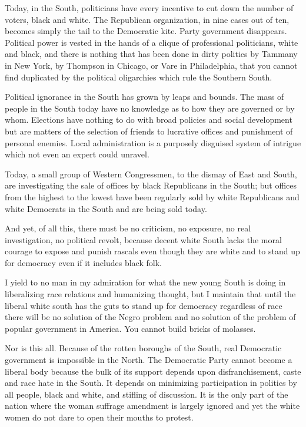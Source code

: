 \documentclass[letterpaper,10pt,english]{jupyterBook}
\begin{document}
\sphinxAtStartPar
Today, in the South, politicians have every incentive to cut down the number of voters, black and white. The Republican organization, in nine cases out of ten, becomes simply the tail to the Democratic kite. Party government disappears. Political power is vested in the hands of a clique of professional politicians, white and black, and there is nothing that has been done in dirty politics by Tammany in New York, by Thompson in Chicago, or Vare in Philadelphia, that you cannot find duplicated by the political oligarchies which rule the Southern South.

\sphinxAtStartPar
Political ignorance in the South has grown by leaps and bounds. The mass of people in the South today have no knowledge as to how they are governed or by whom. Elections have nothing to do with broad policies and social development but are matters of the selection of friends to lucrative offices and punishment of personal enemies. Local administration is a purposely disguised system of intrigue which not even an expert could unravel.

\sphinxAtStartPar
Today, a small group of Western Congressmen, to the dismay of East and South, are investigating the sale of offices by black Republicans in the South; but offices from the highest to the lowest have been regularly sold by white Republicans and white Democrats in the South and are being sold today.

\sphinxAtStartPar
And yet, of all this, there must be no criticism, no exposure, no real investigation, no political revolt, because decent white South lacks the moral courage to expose and punish rascals even though they are white and to stand up for democracy even if it includes black folk.

\sphinxAtStartPar
I yield to no man in my admiration for what the new young South is doing in liberalizing race relations and humanizing thought, but I maintain that until the liberal white south has the guts to stand up for democracy regardless of race there will be no solution of the Negro problem and no solution of the problem of popular government in America. You cannot build bricks of molasses.

\sphinxAtStartPar
Nor is this all. Because of the rotten boroughs of the South, real Democratic government is impossible in the North. The Democratic Party cannot become a liberal body because the bulk of its support depends upon disfranchisement, caste and race hate in the South. It depends on minimizing participation in politics by all people, black and white, and stifling of discussion. It is the only part of the nation where the woman suffrage amendment is largely ignored and yet the white women do not dare to open their mouths to protest.
\end{document}
